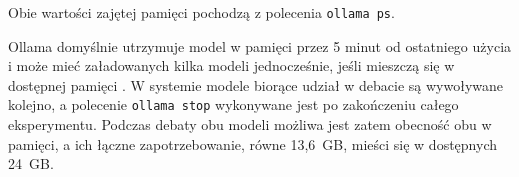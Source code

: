 

Obie wartości zajętej pamięci pochodzą z polecenia \texttt{ollama ps}.

Ollama domyślnie utrzymuje model w pamięci przez 5 minut od ostatniego użycia \cite{ollama_faq} i może mieć załadowanych kilka modeli jednocześnie, jeśli mieszczą się w dostępnej pamięci \cite{ollama_faq}. W systemie modele biorące udział w debacie są wywoływane kolejno, a polecenie \texttt{ollama stop} wykonywane jest po zakończeniu całego eksperymentu. Podczas debaty obu modeli możliwa jest zatem obecność obu w pamięci, a ich łączne zapotrzebowanie, równe 13,6~GB, mieści się w dostępnych 24~GB.
